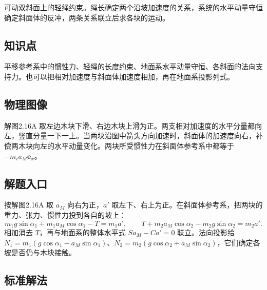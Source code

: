 \documentclass[UTF8,fontset=fandol,a4paper,11pt]{ctexart}
\newcommand{\vect}[1]{\bm{#1}}
\begin{document}
可动双斜面上的轻绳约束。绳长确定两个沿坡加速度的关系，系统的水平动量守恒确定斜面体的反冲，两条关系联立后求各块的运动。



\subsection*{知识点}

平移参考系中的惯性力、轻绳的长度约束、地面系水平动量守恒、各斜面的法向支持力。也可以把相对加速度与斜面体加速度相加，再在地面系投影列式。




\subsection*{物理图像}

解图2.16A 取左边木块下滑、右边木块上滑为正。两支相对加速度的水平分量都向左，竖直分量一下一上。当两块沿图中箭头方向加速时，斜面体的加速度向右，补偿两木块向左的水平动量变化。两块所受惯性力在斜面体参考系中都等于 $-m_i a_M\vect e_x$。



\subsection*{解题入口}

按解图2.16A 取 $a_M$ 向右为正，$a'$ 取左下、右上为正。在斜面体参考系，把两块的重力、张力、惯性力投到各自的坡上：
\[
m_1g\sin\alpha_1+m_1a_M\cos\alpha_1-T=m_1a',\qquad
T+m_2a_M\cos\alpha_2-m_2g\sin\alpha_2=m_2a'.
\]
相加消去 $T$，再与地面系的整体水平式 $Sa_M-Ca'=0$ 联立。法向投影给 $N_1=m_1(g\cos\alpha_1-a_M\sin\alpha_1)$、$N_2=m_2(g\cos\alpha_2+a_M\sin\alpha_2)$，它们确定各坡是否仍与木块接触。



\subsection*{标准解法}
\end{document}
